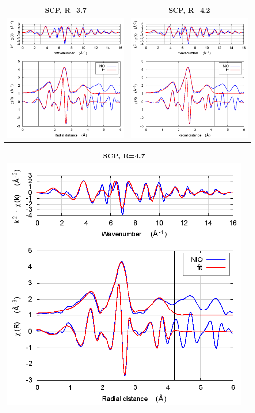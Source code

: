\documentclass[11pt]{article}
\begin{document}
\begin{center}
  \begin{tabular}{cc}
    \textbf{SCP, R=3.7} & \textbf{SCP, R=4.2} \\
    \includegraphics[width=.45\linewidth]{NiO/scf/fit_withSCF_3.7.png} & 
    \includegraphics[width=.45\linewidth]{NiO/scf/fit_withSCF_4.2.png} \\
  \end{tabular}
\end{center}
\begin{center}
  \begin{tabular}{cc}
    \textbf{SCP, R=4.7}&\\
    \includegraphics[width=.45\linewidth]{NiO/scf/fit_withSCF_4.7.png}&\\
  \end{tabular}
\end{center}
\end{document}
